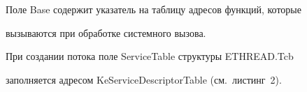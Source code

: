\begin{table}[b]
\begin{center}
\begin{tabular}{|l|}
\end{tabular}





\vspace*{-3pt}





\parbox{206pt}{


  }


\end{center}


\end{table}





  


  Поле {\sf Base} содержит указатель на таблицу адресов функций, которые 


вызываются при обработке системного вызова.


  


  При создании потока поле {\sf ServiceTable} структуры {\sf ETHREAD.Tcb} 


заполняется адресом {\sf KeServiceDescriptorTable} (см.\ листинг~2).


